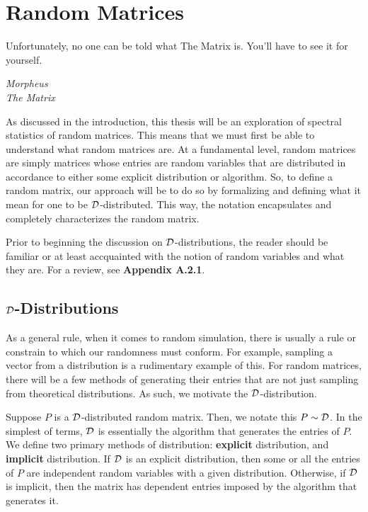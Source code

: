 
\chapter{Random Matrices}

\epigraph{Unfortunately, no one can be told what The Matrix is. You'll have to see it for yourself.}{\textit{Morpheus \\ The Matrix}}

As discussed in the introduction, this thesis will be an exploration of spectral statistics of random matrices. This means that we must first be able to understand what random matrices are.
At a fundamental level, random matrices are simply matrices whose entries are random variables that are distributed in accordance to either some explicit distribution or algorithm.
So, to define a random matrix, our approach will be to do so by formalizing and defining what it mean for one to be $\D$-distributed.
This way, the notation encapsulates and completely characterizes the random matrix.

Prior to beginning the discussion on $\D$-distributions, the reader should be familiar or at least accquainted with the notion of random variables and what they are.
For a review, see \textbf{Appendix A.2.1}.


\section{$\D$-Distributions}

As a general rule, when it comes to random simulation, there is usually a rule or constrain to which our randomness must conform.
For example, sampling a vector from a distribution is a rudimentary example of this.
For random matrices, there will be a few methods of generating their entries that are not just sampling from theoretical distributions.
As such, we motivate the $\D$-distribution.

\begin{definition}[$\D$-distribution]
Suppose $P$ is a $\D$-distributed random matrix. Then, we notate this $P \sim \mathcal{D}$. In the simplest of terms, $\D$ is essentially the algorithm that generates the entries of $P$.
We define two primary methods of distribution: \textbf{explicit} distribution, and \textbf{implicit} distribution.
If $\D$ is an explicit distribution, then some or all the entries of $P$ are independent random variables with a given distribution.
Otherwise, if $\D$ is implicit, then the matrix has dependent entries imposed by the algorithm that generates it.
\end{definition}

